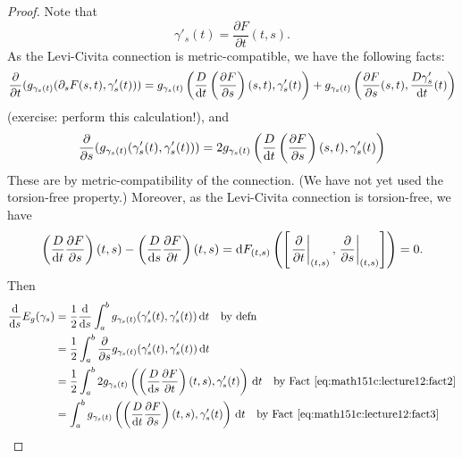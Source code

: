\begin{proof}
Note that
\begin{equation}
\gamma'_{s}(t)=\frac{\partial F}{\partial t}(t,s).
\end{equation}
As the Levi-Civita connection is metric-compatible, we have the
following facts:
\begin{equation}\label{eq:math151c:lecture12:fact1}
\frac{\partial}{\partial t}(g_{\gamma_{s}(t)}(\partial_{s}F(s,t),\gamma'_{s}(t)))
= g_{\gamma_{s}(t)}\left(\frac{D}{\mathrm{d} t}\left(\frac{\partial F}{\partial s}\right)(s,t),\gamma'_{s}(t)\right)+g_{\gamma_{s}(t)}\left(\frac{\partial F}{\partial s}(s,t),\frac{D\gamma'_{s}}{\mathrm{d} t}(t)\right)
\end{equation}
(exercise: perform this  calculation!), and
\begin{equation}\label{eq:math151c:lecture12:fact2}
\frac{\partial}{\partial s}(g_{\gamma_{s}(t)}(\gamma'_{s}(t),\gamma'_{s}(t)))
=2g_{\gamma_{s}(t)}\left(\frac{D}{\mathrm{d} t}\left(\frac{\partial F}{\partial s}\right)(s,t)  ,\gamma'_{s}(t)\right)
\end{equation}
These are by metric-compatibility of the connection. (We have not yet
used the torsion-free property.) Moreover, as the Levi-Civita
connection is torsion-free, we have
\begin{equation}\label{eq:math151c:lecture12:fact3}
\left(\frac{D}{\mathrm{d} t}\frac{\partial F}{\partial s}\right)(t,s)-
\left(\frac{D}{\mathrm{d} s}\frac{\partial F}{\partial t}\right)(t,s)
=\mathrm{d} F_{(t,s)}\left(\left[\left.\frac{\partial}{\partial t}\right|_{(t,s)},\left.\frac{\partial}{\partial s}\right|_{(t,s)}\right]\right)=0.
\end{equation}
Then
\begin{subequations}
  \begin{align}
\frac{\D}{\D s}E_{g}(\gamma_{s})
&=\frac{1}{2}\frac{\D}{\D s}\int^{b}_{a}g_{\gamma_{s}(t)}(\gamma'_{s}(t),\gamma'_{s}(t))\,\D t\quad\mbox{by defn}\\
&=\frac{1}{2}\int^{b}_{a}\frac{\partial}{\partial s}g_{\gamma_{s}(t)}(\gamma'_{s}(t),\gamma'_{s}(t))\,\D t\\
&=\frac{1}{2}\int^{b}_{a}2g_{\gamma_{s}(t)}\left(\left(\frac{D}{\D s}\frac{\partial F}{\partial t}\right)(t,s),\gamma'_{s}(t)\right)\,\D t\quad\mbox{by Fact~\eqref{eq:math151c:lecture12:fact2}}\\
&=\int^{b}_{a}g_{\gamma_{s}(t)}\left(\left(\frac{D}{\D t}\frac{\partial F}{\partial s}\right)(t,s),\gamma'_{s}(t)\right)\,\D t\quad\mbox{by Fact~\eqref{eq:math151c:lecture12:fact3}}\\

\end{align}
\end{subequations}
\end{proof}
